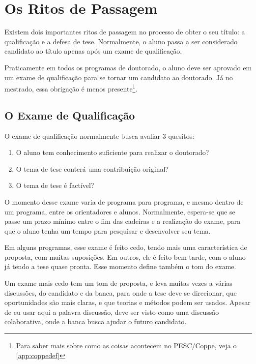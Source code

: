 \chapter{Os Ritos de Passagem}

Existem dois importantes ritos de passagem no processo de obter o seu título: a qualificação e a defesa de tese. Normalmente, o aluno passa a ser considerado candidato ao título apenas após um exame de qualificação. 

Praticamente em todos os programas de doutorado, o aluno deve ser aprovado em um exame de qualificação para se tornar um candidato ao doutorado. Já no mestrado, essa obrigação é menos presente\footnote{Para saber mais sobre como as coisas acontecem no PESC/Coppe, veja o \autoref{app:coppedef}}.

\section{O Exame de Qualificação}

O exame de qualificação normalmente busca avaliar 3 quesitos:

\begin{enumerate}
\item	O aluno tem conhecimento suficiente para realizar o doutorado?
\item	O tema de tese conterá uma contribuição original?
\item	O tema de tese é factível?
\end{enumerate}

O momento desse exame varia de programa para programa, e mesmo dentro de um programa, entre os orientadores e alunos. Normalmente, espera-se que se passe um prazo mínimo entre o fim das cadeiras e a realização do exame, para que o aluno tenha um tempo para pesquisar e desenvolver seu tema. 

Em alguns programas, esse exame é feito cedo, tendo mais uma característica de proposta, com muitas suposições. Em outros, ele é feito bem tarde, com o aluno já tendo a tese quase pronta. Esse momento define também o tom do exame.

Um exame mais cedo tem um tom de proposta, e leva muitas vezes a várias discussões, do candidato e da banca, para onde a tese deve se direcionar, que oportunidades são mais claras, e que teorias e métodos podem ser usados. Apesar de eu usar aqui a palavra discussão, deve ser visto como uma discussão colaborativa, onde a banca busca ajudar o futuro candidato. 

